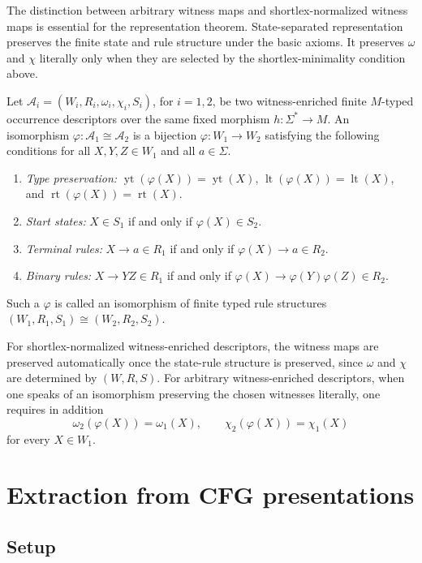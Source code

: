 \documentclass[sub]{jalc}
\newcommand{\yt}{\operatorname{yt}}
\newcommand{\lt}{\operatorname{lt}}
\newcommand{\rt}{\operatorname{rt}}
\begin{document}
The distinction between arbitrary witness maps and shortlex-normalized witness maps is essential for the representation theorem. State-separated representation preserves the finite state and rule structure under the basic axioms. It preserves \(\omega\) and \(\chi\) literally only when they are selected by the shortlex-minimality condition above.

\begin{definition}
\label{def:descriptor-isomorphism}
Let \(\mathcal A_i=(W_i,R_i,\omega_i,\chi_i,S_i)\), for \(i=1,2\), be two
witness-enriched finite \(M\)-typed occurrence descriptors over the same fixed
morphism \(h:\Sigma^*\to M\). An isomorphism
\(\varphi:\mathcal A_1\cong\mathcal A_2\) is a bijection \(\varphi:W_1\to W_2\)
satisfying the following conditions for all \(X,Y,Z\in W_1\) and all
\(a\in\Sigma\).
\begin{enumerate}[label=\textup{(\roman*)},leftmargin=2.2em]
\item \emph{Type preservation:}
\(\yt(\varphi(X))=\yt(X)\), \(\lt(\varphi(X))=\lt(X)\), and
\(\rt(\varphi(X))=\rt(X)\).
\item \emph{Start states:} \(X\in S_1\) if and only if \(\varphi(X)\in S_2\).
\item \emph{Terminal rules:} \(X\to a\in R_1\) if and only if
\(\varphi(X)\to a\in R_2\).
\item \emph{Binary rules:} \(X\to YZ\in R_1\) if and only if
\(\varphi(X)\to\varphi(Y)\varphi(Z)\in R_2\).
\end{enumerate}
Such a \(\varphi\) is called an isomorphism of finite typed rule structures
\((W_1,R_1,S_1)\cong(W_2,R_2,S_2)\).

For shortlex-normalized witness-enriched descriptors, the witness maps are
preserved automatically once the state-rule structure is preserved, since
\(\omega\) and \(\chi\) are determined by \((W,R,S)\). For arbitrary
witness-enriched descriptors, when one speaks of an isomorphism preserving the
chosen witnesses literally, one requires in addition
\[
  \omega_2(\varphi(X))=\omega_1(X),\qquad
  \chi_2(\varphi(X))=\chi_1(X)
\]
for every \(X\in W_1\).
\end{definition}


\section{Extraction from CFG presentations}
\label{sec:extraction}

\subsection{Setup}
\label{subsec:extraction-setup}
\end{document}
